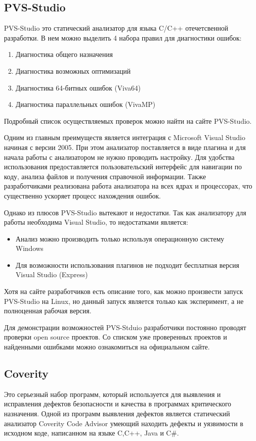 \subsection{PVS-Studio}
PVS-Studio это статический анализатор для языка C/C++ отечетсвенной разработки. В нем можно 
выделить 4 набора правил для диагностики ошибок:
\begin{enumerate}
	\item Диагностика общего назначения
	\item Диагностика возможных оптимизаций
	\item Диагностика 64-битных ошибок (Viva64)
	\item Диагностика параллельных ошибок (VivaMP)
\end{enumerate}
Подробный список осуществляемых проверок можно найти на сайте PVS-Studio.

Одним из главным преимуществ является интеграция с Microsoft Visual Studio начиная с версии 2005.
При этом анализатор поставляется в виде плагина и для начала работы с анализатором не нужно
проводить настройку. Для удобства использования предоставляется пользовательский интерфейс для 
навигации по коду, анализа файлов и получения справочной информации. Также разработчиками реализована 
работа анализатора на всех ядрах и процессорах, что существенно ускоряет процесс нахождения ошибок.

Однако из плюсов PVS-Studio вытекают и недостатки. Так как анализатору для работы необходима  
Visual Studio, то недостатками является:
\begin{itemize}
 \item Анализ можно производить только используя операционную систему Windows
 \item Для возможности использования плагинов не подходит бесплатная версия Visual Studio (Express)     
\end{itemize}

Хотя на сайте разработчиков есть описание того, как можно произвести запуск PVS-Studio на Linux, 
но данный запуск является только как эксперимент, а не полноценная рабочая версия.

Для демонстрации возможностей PVS-Stduio разработчики постоянно проводят проверки open source 
проектов. Со списком уже проверенных проектов и найденными ошибками можно ознакомиться на официальном сайте.

\subsection{Coverity}
Это серьезный набор программ, который используется для выявления и исправления дефектов безопасности
и качества в программах критического назначения. Одной из программ выявления дефектов является
статический анализатор Coverity Code Advisor умеющий находить дефекты и уязвимости в исходном коде, 
написанном на языке C,C++, Java и C\#.  

